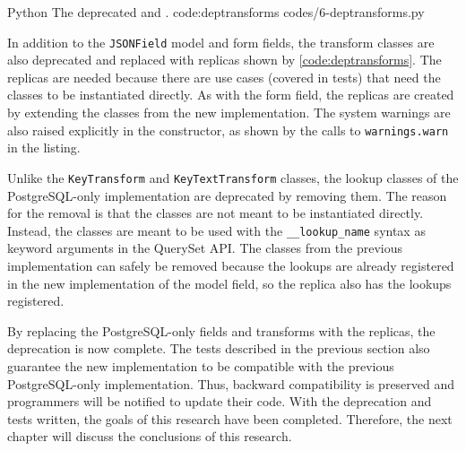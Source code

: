 \listing
{Python}
{The deprecated  and .}
{code:deptransforms}
{codes/6-deptransforms.py}

In addition to the \verb|JSONField| model and form fields, the transform
classes are also deprecated and replaced with replicas shown by
\autoref{code:deptransforms}. The replicas are needed because there are use
cases (covered in tests) that need the classes to be instantiated directly. As
with the form field, the replicas are created by extending the classes from the
new implementation. The system warnings are also raised explicitly in the
constructor, as shown by the calls to \verb|warnings.warn| in the listing.

Unlike the \verb|KeyTransform| and \verb|KeyTextTransform| classes, the lookup
classes of the PostgreSQL-only implementation are deprecated by removing them.
The reason for the removal is that the classes are not meant to be instantiated
directly. Instead, the classes are meant to be used with the
\verb|__lookup_name| syntax as keyword arguments in the QuerySet API. The
classes from the previous implementation can safely be removed because the
lookups are already registered in the new implementation of the model field, so
the replica also has the lookups registered.

By replacing the PostgreSQL-only fields and transforms with the replicas, the
deprecation is now complete. The tests described in the previous section also
guarantee the new implementation to be compatible with the previous
PostgreSQL-only implementation. Thus, backward compatibility is preserved and
programmers will be notified to update their code. With the deprecation and
tests written, the goals of this research have been completed. Therefore, the
next chapter will discuss the conclusions of this research.
